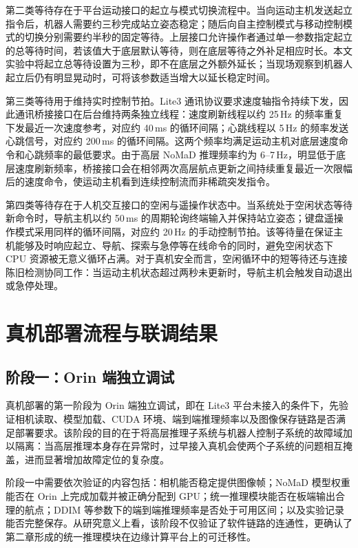 第二类等待存在于平台运动接口的起立与模式切换流程中。当向运动主机发送起立指令后，机器人需要约三秒完成站立姿态稳定；随后向自主控制模式与移动控制模式的切换分别需要约半秒的固定等待。上层接口允许操作者通过单一参数指定起立的总等待时间，若该值大于底层默认等待，则在底层等待之外补足相应时长。本文实验中将起立总等待设置为三秒，即不在底层之外额外延长；当现场观察到机器人起立后仍有明显晃动时，可将该参数适当增大以延长稳定时间。

第三类等待用于维持实时控制节拍。Lite3 通讯协议要求速度轴指令持续下发，因此通讯桥接接口在后台维持两条独立线程：速度刷新线程以约 25\,Hz 的频率重复下发最近一次速度参考，对应约 40\,ms 的循环间隔；心跳线程以 5\,Hz 的频率发送心跳信号，对应约 200\,ms 的循环间隔。这两个频率均满足运动主机对底层速度命令和心跳频率的最低要求。由于高层 NoMaD 推理频率约为 6--7\,Hz，明显低于底层速度刷新频率，桥接接口会在相邻两次高层航点更新之间持续重复最近一次限幅后的速度命令，使运动主机看到连续控制流而非稀疏突发指令。

第四类等待存在于人机交互接口的空闲与遥操作状态中。当系统处于空闲状态等待新命令时，导航主机以约 50\,ms 的周期轮询终端输入并保持站立姿态；键盘遥操作模式采用同样的循环间隔，对应约 20\,Hz 的手动控制节拍。该等待量在保证主机能够及时响应起立、导航、探索与急停等在线命令的同时，避免空闲状态下 CPU 资源被无意义循环占满。对于真机安全而言，空闲循环中的短等待还与连接陈旧检测协同工作：当运动主机状态超过两秒未更新时，导航主机会触发自动退出或急停处理。

\section{真机部署流程与联调结果}

\subsection{阶段一：Orin 端独立调试}

真机部署的第一阶段为 Orin 端独立调试，即在 Lite3 平台未接入的条件下，先验证相机读取、模型加载、CUDA 环境、端到端推理频率以及图像保存链路是否满足部署要求。该阶段的目的在于将高层推理子系统与机器人控制子系统的故障域加以隔离：当高层推理本身存在异常时，过早接入真机会使两个子系统的问题相互掩盖，进而显著增加故障定位的复杂度。

阶段一中需要依次验证的内容包括：相机能否稳定提供图像帧；NoMaD 模型权重能否在 Orin 上完成加载并被正确分配到 GPU；统一推理模块能否在板端输出合理的航点；DDIM 等参数下的端到端推理频率是否处于可用区间；以及实验记录能否完整保存。从研究意义上看，该阶段不仅验证了软件链路的连通性，更确认了第二章形成的统一推理模块在边缘计算平台上的可迁移性。

